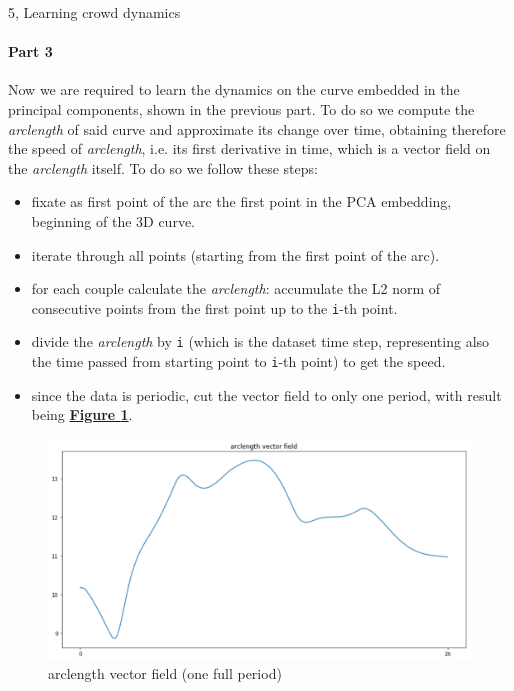 \documentclass[10pt,a4paper]{article}
\begin{document}
\begin{task}{5, Learning crowd dynamics}
\paragraph{Part 3}
Now we are required to learn the dynamics on the curve embedded in the principal components, shown in the previous part. To do so we compute the \textit{arclength} of said curve and approximate its change over time, obtaining therefore the speed of \textit{arclength}, i.e. its first derivative in time, which is a vector field on the \textit{arclength} itself.
To do so we follow these steps:
\begin{itemize}
    \item fixate as first point of the arc the first point in the PCA embedding, beginning of the 3D curve.
    \item iterate through all points (starting from the first point of the arc).
    \item for each couple calculate the \textit{arclength}: accumulate the L2 norm of consecutive points from the first point up to the \texttt{i}-th point.
    \item divide the \textit{arclength} by \texttt{i} (which is the dataset time step, representing also the time passed from starting point to \texttt{i}-th point) to get the speed.
    \item since the data is periodic, cut the vector field to only one period, with result being \textbf{\hyperref[fig:task5-vectorfield]{Figure \ref{fig:task5-vectorfield}}}.
\end{itemize}

\begin{figure}[H]
    \centering
    \includegraphics[scale=0.5]{images/task5-vectorfield.png}
    \caption{arclength vector field (one full period)}
    \label{fig:task5-vectorfield}
\end{figure}


\end{task}
\end{document}
